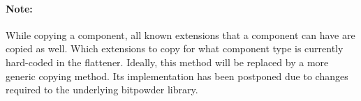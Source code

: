 
















\paragraph{Note:}
While copying a component, all known extensions that a component can have are
copied as well. Which extensions to copy for what component type is currently
hard-coded in the flattener. Ideally, this method will be replaced by a more
generic copying method. Its implementation has been postponed due to changes
required to the underlying bitpowder library. 



